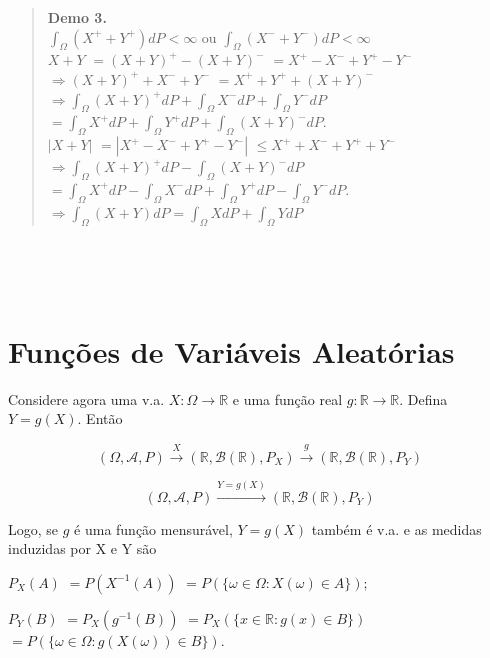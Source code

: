 \documentclass[
]{book}
\begin{document}
\begin{quote}
\textbf{Demo 3.}\\
\(\displaystyle\int_\Omega \left(X^+ + Y^+\right) dP < \infty\) ou \(\displaystyle\int_\Omega \left(X^- + Y^-\right) dP < \infty\)\\
\(X + Y\) \(= (X + Y)^+ - (X+Y)^-\) \(= X^+ - X^- + Y^+ - Y^-\)\\
\(\Rightarrow (X+Y)^+ + X^- + Y^-\) \(= X^+ + Y^+ + (X+Y)^-\)\\
\(\Rightarrow \displaystyle\int_\Omega (X+Y)^+dP + \int_\Omega X^-dP + \int_\Omega Y^-dP\)\\
\(=\displaystyle\int_\Omega X^+dP + \int_\Omega Y^+dP + \int_\Omega (X+Y)^-dP\).\\
\(|X+Y|\) \(= |X^+-X^-+Y^+-Y^-|\) \(\leq X^++X^-+Y^++Y^-\)\\
\(\Rightarrow \displaystyle\int_\Omega (X+Y)^+dP - \int_\Omega(X+Y)^-dP\) \(=\displaystyle \int_\Omega X^+dP -\int_\Omega X^-dP + \int_\Omega Y^+dP -\int_\Omega Y^-dP\).\\
\(\Rightarrow \displaystyle\int_\Omega(X+Y)dP = \int_\Omega XdP + \int_\Omega YdP\)
\end{quote}

\(~\)

\(~\)

\hypertarget{funuxe7uxf5es-de-variuxe1veis-aleatuxf3rias}{%
\section{Funções de Variáveis Aleatórias}\label{funuxe7uxf5es-de-variuxe1veis-aleatuxf3rias}}

Considere agora uma v.a. \(X: \Omega \longrightarrow \mathbb{R}\) e uma função real \(g: \mathbb{R} \longrightarrow \mathbb{R}\). Defina \(Y = g(X)\). Então

\[(\Omega, \mathcal{A},P) \overset{X}{\longrightarrow}(\mathbb{R},\mathcal{B}(\mathbb{R}),P_X)\overset{g}{\longrightarrow}(\mathbb{R},\mathcal{B}(\mathbb{R}),P_Y)\]

\[(\Omega, \mathcal{A},P)\overset{Y = g(X)}{\longrightarrow}(\mathbb{R},\mathcal{B}(\mathbb{R}),P_Y)\]

Logo, se \(g\) é uma função mensurável, \(Y=g(X)\) também é v.a. e as medidas induzidas por X e Y são

\(P_X(A)\) \(= P(X^{-1}(A))\) \(= P\left(\{\omega \in \Omega : X(\omega) \in A\}\right)\);

\(P_Y(B)\) \(= P_X(g^{-1}(B))\) \(= P_X\left(\{x \in \mathbb{R} : g(x) \in B\}\right)\) \(= P\left(\{\omega \in \Omega : g\left(X(\omega)\right) \in B\}\right)\).
\end{document}

